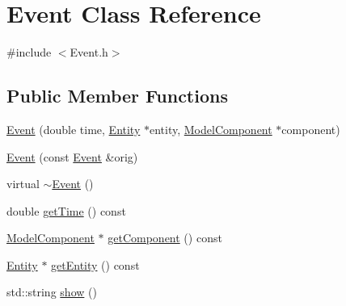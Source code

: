 \hypertarget{class_event}{\section{Event Class Reference}
\label{class_event}
}


{\ttfamily \#include $<$Event.\-h$>$}

\subsection*{Public Member Functions}
\begin{DoxyCompactItemize}
\item 
\hyperlink{class_event_a81e573f9452ca3a4d1b07e2347235e87}{Event} (double time, \hyperlink{class_entity}{Entity} $\ast$entity, \hyperlink{class_model_component}{Model\-Component} $\ast$component)
\item 
\hyperlink{class_event_a537ad58d679329069468e8cf2b2904d0}{Event} (const \hyperlink{class_event}{Event} \&orig)
\item 
virtual \hyperlink{class_event_a7704ec01ce91e673885792054214b3d2}{$\sim$\-Event} ()
\item 
double \hyperlink{class_event_a008a7989d0849a45613917cedc27f27e}{get\-Time} () const 
\item 
\hyperlink{class_model_component}{Model\-Component} $\ast$ \hyperlink{class_event_a7fb897ded1b3f0b946b25740f2e2eda0}{get\-Component} () const 
\item 
\hyperlink{class_entity}{Entity} $\ast$ \hyperlink{class_event_a6890c776c6c2e13abbc0892fc7333102}{get\-Entity} () const 
\item 
std\-::string \hyperlink{class_event_a640f132001d454af52cb0d0e20ebb856}{show} ()
\end{DoxyCompactItemize}


